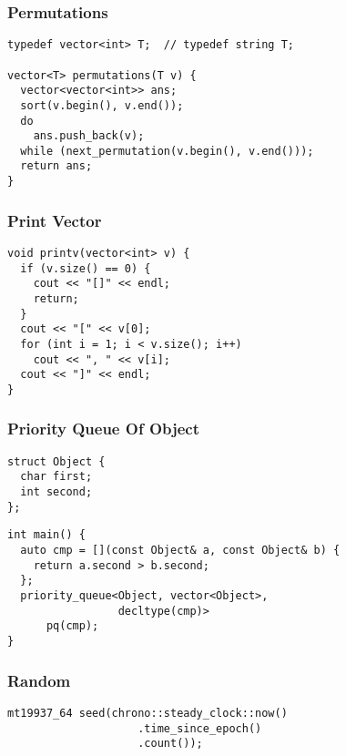\documentclass[twoside]{article}
\begin{document}
\begin{multicols*}{2}
\subsubsectionfont{\large\bfseries\sffamily\underline}
\subsubsection*{Permutations}
\begin{verbatim}
typedef vector<int> T;  // typedef string T;

vector<T> permutations(T v) {
  vector<vector<int>> ans;
  sort(v.begin(), v.end());
  do
    ans.push_back(v);
  while (next_permutation(v.begin(), v.end()));
  return ans;
}
\end{verbatim}

\subsubsectionfont{\large\bfseries\sffamily\underline}
\subsubsection*{Print Vector}
\begin{verbatim}
void printv(vector<int> v) {
  if (v.size() == 0) {
    cout << "[]" << endl;
    return;
  }
  cout << "[" << v[0];
  for (int i = 1; i < v.size(); i++)
    cout << ", " << v[i];
  cout << "]" << endl;
}
\end{verbatim}

\subsubsectionfont{\large\bfseries\sffamily\underline}
\subsubsection*{Priority Queue Of Object}
\begin{verbatim}
struct Object {
  char first;
  int second;
};
\end{verbatim}
\vspace{-12pt}
\begin{verbatim}
int main() {
  auto cmp = [](const Object& a, const Object& b) {
    return a.second > b.second;
  };
  priority_queue<Object, vector<Object>,
                 decltype(cmp)>
      pq(cmp);
}
\end{verbatim}

\subsubsectionfont{\large\bfseries\sffamily\underline}
\subsubsection*{Random}
\begin{verbatim}
mt19937_64 seed(chrono::steady_clock::now()
                    .time_since_epoch()
                    .count());


\end{verbatim}
\end{multicols*}
\end{document}
